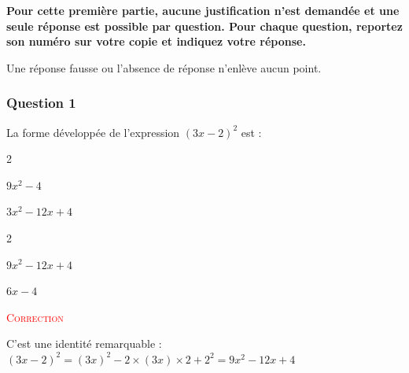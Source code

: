 \textbf{Pour cette première partie, aucune justification n'est demandée et une seule réponse est possible par question. Pour chaque question, reportez son numéro sur votre copie et indiquez votre réponse.}

	Une réponse fausse ou l'absence de réponse n'enlève aucun point.


	\vspace{0,25cm}
\subsubsection*{Question 1}
La forme développée de l'expression \mbox{$(3x-2)^2$} est :
		\begin{enumerate}[label=\alph*)]
\begin{multicols}{2}
			\item \mbox{$9x^2-4$}
			\item \mbox{$3x^2-12x+4$}

\end{multicols}
\begin{multicols}{2}
	\item \mbox{$9x^2-12x+4$}
	\item \mbox{$6x-4$}

	\end{multicols}
		\end{enumerate}


 \textcolor{red}{\textsc{Correction}}


	C'est une identité remarquable : \quad \mbox{$(3x-2)^2 = (3x)^2 - 2\times (3x) \times 2 + 2^2 = 9x^2-12x+4$}

	\hfill {}

